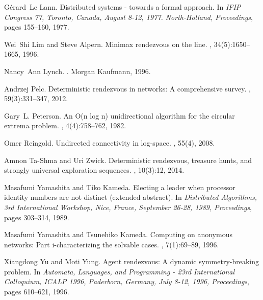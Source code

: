 \documentclass[11pt]{article}
\begin{document}
\begin{thebibliography}{10}
G{\'{e}}rard~Le Lann.
\newblock Distributed systems - towards a formal approach.
\newblock In {\em  IFIP Congress 77, Toronto, Canada, August 8-12, 1977. North-Holland, Proceedings}, pages 155--160, 1977.



Wei~Shi Lim and Steve Alpern.
\newblock Minimax rendezvous on the line.
, 34(5):1650--1665,
  1996.

Nancy~Ann Lynch.
.
\newblock Morgan Kaufmann, 1996.


Andrzej Pelc.
\newblock Deterministic rendezvous in networks: {A} comprehensive survey.
, 59(3):331--347, 2012.

Gary~L. Peterson.
\newblock An O(n log n) unidirectional algorithm for the circular extrema
  problem.
, 4(4):758--762, 1982.



Omer Reingold.
\newblock Undirected connectivity in log-space.
, 55(4), 2008.

Amnon Ta{-}Shma and Uri Zwick.
\newblock Deterministic rendezvous, treasure hunts, and strongly universal
  exploration sequences.
, 10(3):12, 2014.

Masafumi Yamashita and Tiko Kameda.
\newblock Electing a leader when processor identity numbers are not distinct
  (extended abstract).
\newblock In {\em Distributed Algorithms, 3rd International Workshop, Nice,
  France, September 26-28, 1989, Proceedings}, pages 303--314, 1989.


Masafumi Yamashita and Tsunehiko Kameda.
\newblock Computing on anonymous networks: Part i-characterizing the solvable
  cases.
,
  7(1):69--89, 1996.

Xiangdong Yu and Moti Yung.
\newblock Agent rendezvous: A dynamic symmetry-breaking problem.
\newblock In {\em Automata, Languages, and Programming - 23rd International
  Colloquium, ICALP 1996, Paderborn, Germany, July 8-12, 1996, Proceedings}, pages 610--621, 1996.
\end{thebibliography}
\end{document}
